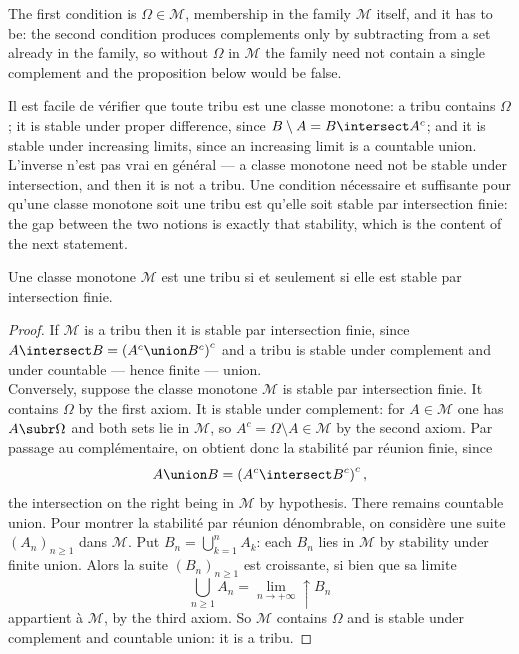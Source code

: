 \begin{remark}
  The first condition is $\Omega \in \mathcal{M}$, membership in the family
  $\mathcal{M}$ itself, and it has to be: the second condition produces complements
  only by subtracting from a set already in the family, so without $\Omega$ in
  $\mathcal{M}$ the family need not contain a single complement and the proposition
  below would be false.
\end{remark}

Il est facile de vérifier que toute tribu est une classe monotone: a tribu contains
$\Omega$; it is stable under proper difference, since
$B \setminus A = B \intersect A^{c}$; and it is stable under increasing limits,
since an increasing limit is a countable union. L'inverse n'est pas vrai en
général --- a classe monotone need not be stable under intersection, and then it is
not a tribu. Une condition nécessaire et suffisante pour qu'une classe monotone soit
une tribu est qu'elle soit stable par intersection finie: the gap between the two
notions is exactly that stability, which is the content of the next statement.

\begin{prop}
  Une classe monotone $\mathcal{M}$ est une tribu si et seulement si elle est stable
  par intersection finie.
\end{prop}

\begin{proof}
  If $\mathcal{M}$ is a tribu then it is stable par intersection finie, since
  $A \intersect B = \left(A^{c} \union B^{c}\right)^{c}$ and a tribu is stable under
  complement and under countable --- hence finite --- union.\\
  Conversely, suppose the classe monotone $\mathcal{M}$ is stable par intersection
  finie. It contains $\Omega$ by the first axiom. It is stable under
  complement: for $A \in \mathcal{M}$ one has $A \subr \Omega$ and both sets lie in
  $\mathcal{M}$, so $A^{c} = \Omega \setminus A \in \mathcal{M}$ by the second
  axiom. Par passage au complémentaire, on obtient donc la stabilité par réunion
  finie, since
  \[
    A \union B = \left(A^{c} \intersect B^{c}\right)^{c},
  \]
  the intersection on the right being in $\mathcal{M}$ by hypothesis. There remains
  countable union. Pour montrer la stabilité par réunion dénombrable, on considère
  une suite $(A_{n})_{n \geq 1}$ dans $\mathcal{M}$. Put
  $B_{n} = \bigcup_{k=1}^{n} A_{k}$: each $B_{n}$ lies in $\mathcal{M}$ by stability
  under finite union. Alors la suite $(B_{n})_{n \geq 1}$ est croissante, si bien
  que sa limite
  \[
    \bigcup_{n \geq 1} A_{n} = \lim_{n \to +\infty} \uparrow B_{n}
  \]
  appartient à $\mathcal{M}$, by the third axiom. So $\mathcal{M}$ contains
  $\Omega$ and is stable under complement and countable union: it is a tribu.
\end{proof}

